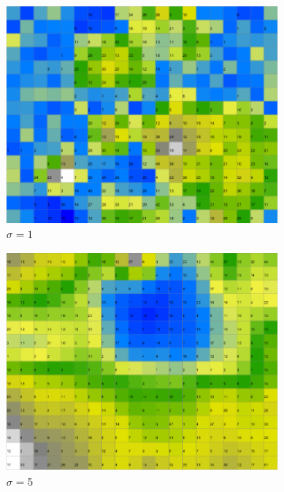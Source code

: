 \documentclass{acm_proc_article-sp}
\begin{document}
\begin{figure}
\centering
    \centering
    \begin{subfigure}[b]{0.30\linewidth}
        \includegraphics[width=\linewidth]{img/wine-newmid-activity-histogram-sigma-1}
        \caption{$\sigma=1$}
    \end{subfigure}
    \begin{subfigure}[b]{0.30\linewidth}
        \includegraphics[width=\linewidth]{img/wine-newmid-activity-histogram-sigma-5}
        \caption{$\sigma=5$}
    \end{subfigure}
    \begin{subfigure}[b]{0.30\linewidth}

\end{subfigure}
\end{figure}
\end{document}
